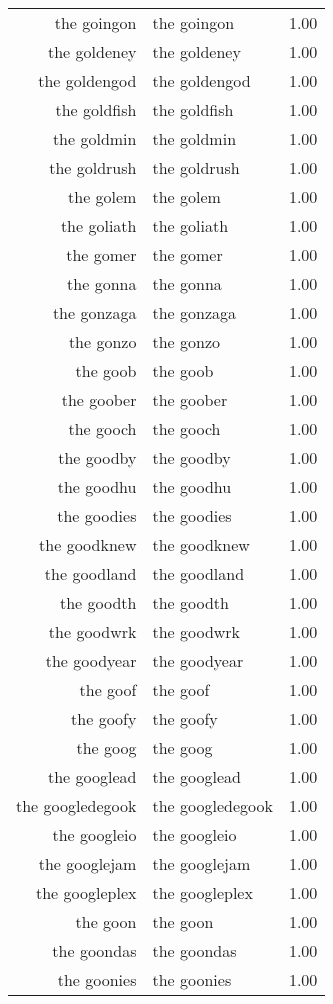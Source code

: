 \begin{table}[ht]
\begin{tabular}{rlr}
  the goingon & the goingon & 1.00 \\ 
  the goldeney & the goldeney & 1.00 \\ 
  the goldengod & the goldengod & 1.00 \\ 
  the goldfish & the goldfish & 1.00 \\ 
  the goldmin & the goldmin & 1.00 \\ 
  the goldrush & the goldrush & 1.00 \\ 
  the golem & the golem & 1.00 \\ 
  the goliath & the goliath & 1.00 \\ 
  the gomer & the gomer & 1.00 \\ 
  the gonna & the gonna & 1.00 \\ 
  the gonzaga & the gonzaga & 1.00 \\ 
  the gonzo & the gonzo & 1.00 \\ 
  the goob & the goob & 1.00 \\ 
  the goober & the goober & 1.00 \\ 
  the gooch & the gooch & 1.00 \\ 
  the goodby & the goodby & 1.00 \\ 
  the goodhu & the goodhu & 1.00 \\ 
  the goodies & the goodies & 1.00 \\ 
  the goodknew & the goodknew & 1.00 \\ 
  the goodland & the goodland & 1.00 \\ 
  the goodth & the goodth & 1.00 \\ 
  the goodwrk & the goodwrk & 1.00 \\ 
  the goodyear & the goodyear & 1.00 \\ 
  the goof & the goof & 1.00 \\ 
  the goofy & the goofy & 1.00 \\ 
  the goog & the goog & 1.00 \\ 
  the googlead & the googlead & 1.00 \\ 
  the googledegook & the googledegook & 1.00 \\ 
  the googleio & the googleio & 1.00 \\ 
  the googlejam & the googlejam & 1.00 \\ 
  the googleplex & the googleplex & 1.00 \\ 
  the goon & the goon & 1.00 \\ 
  the goondas & the goondas & 1.00 \\ 
  the goonies & the goonies & 1.00 \\ 

\end{tabular}
\end{table}
